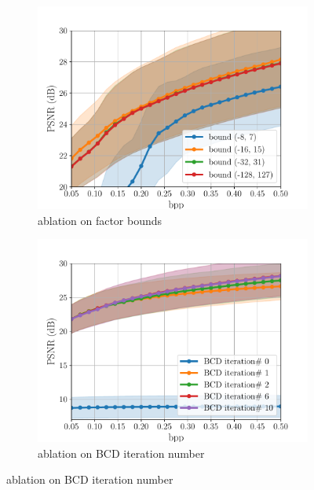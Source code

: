 \begin{figure}[t]
	\centering
	\begin{subfigure}{.45\textwidth}
		\centering
		\includegraphics[width=.95\textwidth]{figures/ablation_bounds_psnr.pdf}
		\caption{ablation on factor bounds}
		\label{fig: bounds ablation psnr-vs-bpp}
	\end{subfigure}
    \begin{subfigure}{.45\textwidth}
		\centering
		\includegraphics[width=.95\textwidth]{figures/ablation_iternum_psnr.pdf}
		\caption{ablation on BCD iteration number}

\end{subfigure}
\end{figure}
